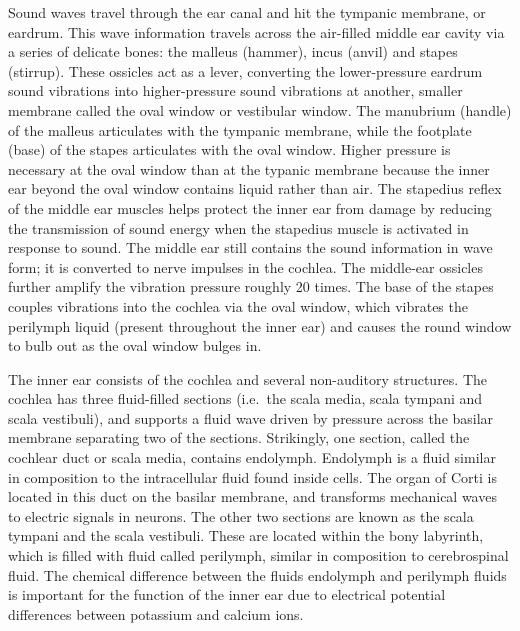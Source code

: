 \documentclass[]{book}
\begin{document}
Sound waves travel through the ear canal and hit the tympanic membrane, or eardrum. This wave information travels across the air-filled middle ear cavity via a series of delicate bones: the malleus (hammer), incus (anvil) and stapes (stirrup). These ossicles act as a lever, converting the lower-pressure eardrum sound vibrations into higher-pressure sound vibrations at another, smaller membrane called the oval window or vestibular window. The manubrium (handle) of the malleus articulates with the tympanic membrane, while the footplate (base) of the stapes articulates with the oval window. Higher pressure is necessary at the oval window than at the typanic membrane because the inner ear beyond the oval window contains liquid rather than air. The stapedius reflex of the middle ear muscles helps protect the inner ear from damage by reducing the transmission of sound energy when the stapedius muscle is activated in response to sound. The middle ear still contains the sound information in wave form; it is converted to nerve impulses in the cochlea.
The middle-ear ossicles further amplify the vibration pressure roughly 20 times. The base of the stapes couples vibrations into the cochlea via the oval window, which vibrates the perilymph liquid (present throughout the inner ear) and causes the round window to bulb out as the oval window bulges in.

The inner ear consists of the cochlea and several non-auditory structures. The cochlea has three fluid-filled sections (i.e.~the scala media, scala tympani and scala vestibuli), and supports a fluid wave driven by pressure across the basilar membrane separating two of the sections. Strikingly, one section, called the cochlear duct or scala media, contains endolymph. Endolymph is a fluid similar in composition to the intracellular fluid found inside cells. The organ of Corti is located in this duct on the basilar membrane, and transforms mechanical waves to electric signals in neurons. The other two sections are known as the scala tympani and the scala vestibuli. These are located within the bony labyrinth, which is filled with fluid called perilymph, similar in composition to cerebrospinal fluid. The chemical difference between the fluids endolymph and perilymph fluids is important for the function of the inner ear due to electrical potential differences between potassium and calcium ions.
\end{document}
